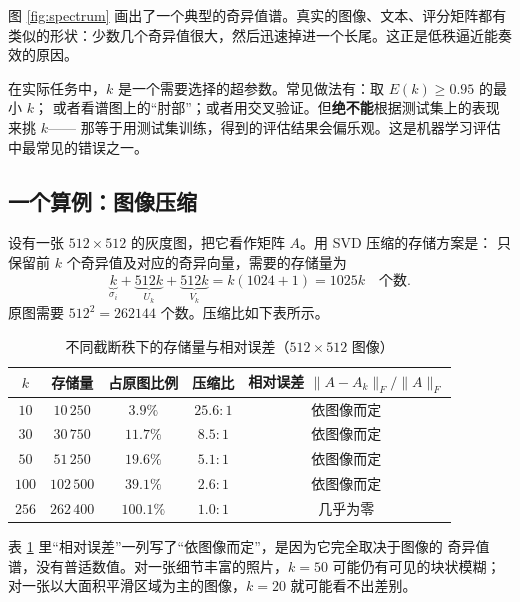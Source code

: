 \documentclass[UTF8, 11pt, a4paper, fontset=windows]{ctexart}
\theoremstyle{cnthm}
\theoremstyle{cndef}
\newcommand{\nrm}[1]{\lVert #1 \rVert}
\begin{document}
图 \ref{fig:spectrum} 画出了一个典型的奇异值谱。真实的图像、文本、评分矩阵都有
类似的形状：少数几个奇异值很大，然后迅速掉进一个长尾。这正是低秩逼近能奏效的原因。

\begin{warnbox}[$k$ 不能看测试集来选]
在实际任务中，$k$ 是一个需要选择的超参数。常见做法有：取 $E(k)\ge0.95$ 的最小 $k$；
或者看谱图上的“肘部”；或者用交叉验证。但\textbf{绝不能}根据测试集上的表现来挑 $k$——
那等于用测试集训练，得到的评估结果会偏乐观。这是机器学习评估中最常见的错误之一。
\end{warnbox}

\subsection{一个算例：图像压缩}

设有一张 $512\times 512$ 的灰度图，把它看作矩阵 $A$。用 SVD 压缩的存储方案是：
只保留前 $k$ 个奇异值及对应的奇异向量，需要的存储量为
\begin{equation}
  \underbrace{k}_{\sigma_i}+\underbrace{512k}_{U_k}+\underbrace{512k}_{V_k}
  =k(1024+1)=1025k \quad\text{个数}.
\end{equation}
原图需要 $512^2=262144$ 个数。压缩比如下表所示。

\begin{table}[htbp]
\centering
\small
\caption{不同截断秩下的存储量与相对误差（$512\times512$ 图像）}\label{tab:compress}
\renewcommand{\arraystretch}{1.35}
\begin{tabular}{@{}ccccc@{}}
\toprule
$k$ & 存储量 & 占原图比例 & 压缩比 & 相对误差 $\nrm{A-A_k}_F/\nrm{A}_F$ \\
\midrule
$10$  & $10\,250$  & $3.9\%$  & $25.6:1$ & 依图像而定 \\
$30$  & $30\,750$  & $11.7\%$ & $8.5:1$  & 依图像而定 \\
$50$  & $51\,250$  & $19.6\%$ & $5.1:1$  & 依图像而定 \\
$100$ & $102\,500$ & $39.1\%$ & $2.6:1$  & 依图像而定 \\
$256$ & $262\,400$ & $100.1\%$& $1.0:1$  & 几乎为零 \\
\bottomrule
\end{tabular}
\end{table}

表 \ref{tab:compress} 里“相对误差”一列写了“依图像而定”，是因为它完全取决于图像的
奇异值谱，没有普适数值。对一张细节丰富的照片，$k=50$ 可能仍有可见的块状模糊；
对一张以大面积平滑区域为主的图像，$k=20$ 就可能看不出差别。
\end{document}
